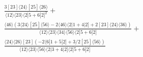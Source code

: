 \documentclass[varwidth, border=5pt]{standalone}
\begin{document}
\begin{my}
$\begin{gathered}
\scriptscriptstyle\frac{3[23]⟨24⟩[25]⟨26⟩}{⟨12⟩⟨23⟩⟨2|5+6|2]^2}+\\
\scriptscriptstyle\frac{⟨46⟩(3⟨24⟩[25]⟨56⟩-2⟨46⟩⟨2|1+4|2]+2[23]⟨24⟩⟨36⟩)}{⟨12⟩⟨23⟩⟨34⟩⟨56⟩⟨2|5+6|2]}+\\
\scriptscriptstyle\frac{⟨24⟩⟨26⟩[23](-2⟨6|1+5|2]+3/2[25]⟨56⟩)}{⟨12⟩⟨23⟩⟨56⟩⟨2|3+4|2]⟨2|5+6|2]}\phantom{+}
\end{gathered}$
\end{my}
\end{document}
